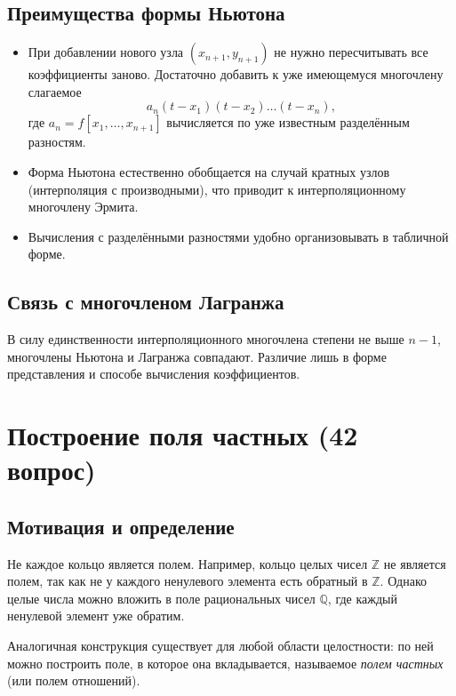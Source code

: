 \documentclass[a4paper,12pt]{article}
\theoremstyle{definition}
\theoremstyle{plain}
\theoremstyle{remark}
\begin{document}
	\subsection{Преимущества формы Ньютона}
	
	\begin{itemize}
		\item При добавлении нового узла \( (x_{n+1}, y_{n+1}) \) не нужно пересчитывать все коэффициенты заново. Достаточно добавить к уже имеющемуся многочлену слагаемое
		\[
		a_n (t - x_1)(t - x_2)\dots(t - x_n),
		\]
		где \( a_n = f[x_1, \dots, x_{n+1}] \) вычисляется по уже известным разделённым разностям.
		\item Форма Ньютона естественно обобщается на случай кратных узлов (интерполяция с производными), что приводит к интерполяционному многочлену Эрмита.
		\item Вычисления с разделёнными разностями удобно организовывать в табличной форме.
	\end{itemize}
	
	\subsection{Связь с многочленом Лагранжа}
	
	В силу единственности интерполяционного многочлена степени не выше \( n-1 \), многочлены Ньютона и Лагранжа совпадают. Различие лишь в форме представления и способе вычисления коэффициентов.
	
	
	
	\newpage
	\section{Построение поля частных (42 вопрос)}
	
	\subsection{Мотивация и определение}
	
	Не каждое кольцо является полем. Например, кольцо целых чисел \( \mathbb{Z} \) не является полем, так как не у каждого ненулевого элемента есть обратный в \( \mathbb{Z} \). Однако целые числа можно вложить в поле рациональных чисел \( \mathbb{Q} \), где каждый ненулевой элемент уже обратим.
	
	Аналогичная конструкция существует для любой области целостности: по ней можно построить поле, в которое она вкладывается, называемое \textit{полем частных} (или полем отношений).
	
\end{document}
